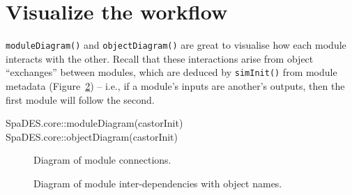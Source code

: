 \documentclass[
  letterpaper,
  DIV=11,
  numbers=noendperiod]{scrreprt}
\newenvironment{Shaded}{\begin{snugshade}}{\end{snugshade}}
\newcommand{\FunctionTok}[1]{\textcolor[rgb]{0.28,0.35,0.67}{#1}}
\newcommand{\NormalTok}[1]{\textcolor[rgb]{0.00,0.23,0.31}{#1}}
\newcommand{\SpecialCharTok}[1]{\textcolor[rgb]{0.37,0.37,0.37}{#1}}
\begin{document}
\section{Visualize the workflow}\label{visualize-the-workflow}

\texttt{moduleDiagram()} and \texttt{objectDiagram()} are great to
visualise how each module interacts with the other. Recall that these
interactions arise from object ``exchanges'' between modules, which are
deduced by \texttt{simInit()} from module metadata
(Figure~\ref{fig-objectDiagram}) -- i.e., if a module's inputs are
another's outputs, then the first module will follow the second.

\begin{Shaded}
\begin{Highlighting}[]
\NormalTok{SpaDES.core}\SpecialCharTok{::}\FunctionTok{moduleDiagram}\NormalTok{(castorInit)}
\NormalTok{SpaDES.core}\SpecialCharTok{::}\FunctionTok{objectDiagram}\NormalTok{(castorInit)}
\end{Highlighting}
\end{Shaded}

\begin{figure}


\caption{\label{fig-moduleDiagram}Diagram of module connections.}

\end{figure}%

\begin{figure}


\caption{\label{fig-objectDiagram}Diagram of module inter-dependencies
with object names.}

\end{figure}%
\end{document}

